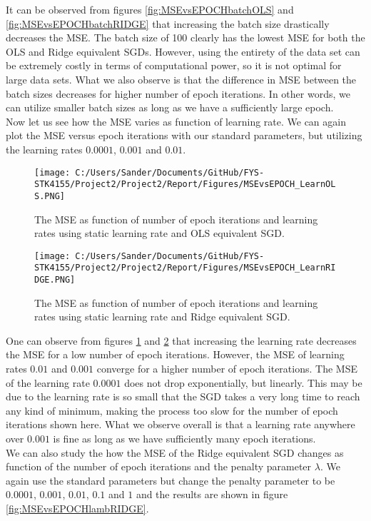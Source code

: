 \documentclass[12pt,a4paper]{article}
\begin{document}
\noindent It can be observed from figures \ref{fig:MSEvsEPOCHbatchOLS} and \ref{fig:MSEvsEPOCHbatchRIDGE} that increasing the batch size drastically decreases the MSE. The batch size of 100 clearly has the lowest MSE for both the OLS and Ridge equivalent SGDs. However, using the entirety of the data set can be extremely costly in terms of computational power, so it is not optimal for large data sets. What we also observe is that the difference in MSE between the batch sizes decreases for higher number of epoch iterations. In other words, we can utilize smaller batch sizes as long as we have a sufficiently large epoch. 
\\
Now let us see how the MSE varies as function of learning rate. We can again plot the MSE versus epoch iterations with our standard parameters, but utilizing the learning rates $0.0001$, $0.001$ and $0.01$.

\begin{figure}[H]
\centering
\texttt{[image: C:/Users/Sander/Documents/GitHub/FYS-STK4155/Project2/Project2/Report/Figures/MSEvsEPOCH\_LearnOLS.PNG]}
\caption{\label{fig:MSEvsEPOCHlaernOLS} The MSE as function of number of epoch iterations and learning rates using static learning rate and OLS equivalent SGD.}
\end{figure}

\begin{figure}[H]
\centering
\texttt{[image: C:/Users/Sander/Documents/GitHub/FYS-STK4155/Project2/Project2/Report/Figures/MSEvsEPOCH\_LearnRIDGE.PNG]}
\caption{\label{fig:MSEvsEPOCHlearnRIDGE} The MSE as function of number of epoch iterations and learning rates using static learning rate and Ridge equivalent SGD.}
\end{figure}

\noindent One can observe from figures \ref{fig:MSEvsEPOCHlaernOLS} and \ref{fig:MSEvsEPOCHlearnRIDGE} that increasing the learning rate decreases the MSE for a low number of epoch iterations. However, the MSE of learning rates $0.01$ and $0.001$ converge for a higher number of epoch iterations. The MSE of the learning rate $0.0001$ does not drop exponentially, but linearly. This may be due to the learning rate is so small that the SGD takes a very long time to reach any kind of minimum, making the process too slow for the number of epoch iterations shown here. What we observe overall is that a learning rate anywhere over $0.001$ is fine as long as we have sufficiently many epoch iterations. 
\\
We can also study the how the MSE of the Ridge equivalent SGD changes as function of the number of epoch iterations and the penalty parameter $\lambda$. We again use the standard parameters but change the penalty parameter to be $0.0001$, $0.001$, $0.01$, $0.1$ and $1$ and the results are shown in figure \ref{fig:MSEvsEPOCHlambRIDGE}.
\end{document}
